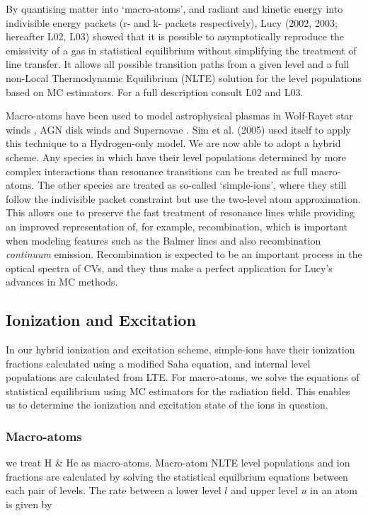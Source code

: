 \documentclass[preprint, a4paper, 11pt]{aastex}
\begin{document}
By quantising matter into `macro-atoms', and radiant and kinetic 
energy into indivisible energy packets (r- and k- packets respectively), 
Lucy (2002, 2003\nocite{lucy2002, lucy2003}; hereafter L02, L03) showed that it is possible 
to asymptotically reproduce the emissivity of a gas in statistical equilibrium 
without simplifying the treatment of line transfer. 
It allows all possible transition paths from a given level and a full non-Local 
Thermodynamic Equilibrium (NLTE) solution for the level populations based on MC estimators. 
For a full description consult L02 and L03. 

Macro-atoms have been used to model astrophysical plasmas in 
Wolf-Rayet star winds \cite{sim2004}, AGN disk winds \citep{simlong2008, tatum2012}
and Supernovae \citep{kasen2006, kerzendorfsim}.
Sim et al. (2005) used \py itself to apply this technique to
a Hydrogen-only model. We are now able to adopt a hybrid scheme. 
Any species in which have their level populations determined by
more complex interactions than resonance transitions
can be treated as full macro-atoms. The other species are treated as so-called `simple-ions',
where they still follow the indivisible packet constraint but use the two-level atom approximation.
This allows one to preserve the fast treatment of resonance lines while providing 
an improved representation of, for example, recombination, which is important when modeling features 
such as the Balmer lines and also recombination {\sl continuum} emission. 
Recombination is expected to be an important process in the optical
spectra of CVs, and they thus make a perfect application for Lucy's 
advances in MC methods.


\subsection{Ionization and Excitation}

In our hybrid ionization and excitation scheme, 
simple-ions have their ionization fractions
calculated using a modified Saha equation, and internal level populations are
calculated from LTE. For macro-atoms, we solve the equations of statistical 
equilibrium using MC estimators for the radiation field. This enables us to 
determine the ionization and excitation state of the ions in question.

\subsubsection{Macro-atoms}
we treat H \& He as macro-atoms. 
Macro-atom NLTE level populations and ion fractions are calculated by solving 
the statistical equilbrium equations between each pair of levels. The rate
between a lower level $l$ and upper level $u$ in an atom is given by
\end{document}
